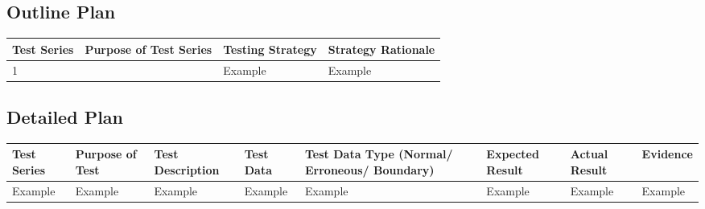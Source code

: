 \begin{landscape}
\subsection{Outline Plan}

\begin{center}
    \begin{tabular}{|p{2cm}|p{5cm}|p{5cm}|p{4cm}|}
        \hline
        \textbf{Test Series} & \textbf{Purpose of Test Series} & \textbf{Testing Strategy} & \textbf{Strategy Rationale}\\ \hline
        1 &  & Example & Example \\ \hline
    \end{tabular}
\end{center}

\subsection{Detailed Plan}

\begin{center}
    \begin{longtable}{|p{1.5cm}|p{2.5cm}|p{2.5cm}|p{2cm}|p{2cm}|p{2cm}|p{2cm}|p{2cm}|}
        \hline
        \textbf{Test Series} & \textbf{Purpose of Test} & \textbf{Test Description} & \textbf{Test Data} & \textbf{Test Data Type (Normal/ Erroneous/ Boundary)} & \textbf{Expected Result} & \textbf{Actual Result} & \textbf{Evidence}\\ \hline
        Example & Example & Example & Example & Example & Example & Example & Example \\ \hline
    \end{longtable}
\end{center}
\end{landscape}